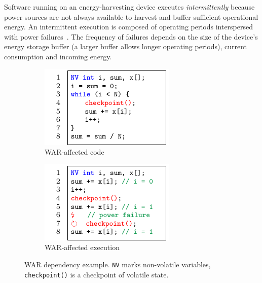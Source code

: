 Software running on an energy-harvesting device executes {\em intermittently} because power sources are not always available to harvest and buffer sufficient operational energy. An intermittent execution is composed of operating periods interspersed with power failures~\cite{dino,chain,alpaca,ratchet}. The frequency of failures depends on the size of the device's energy storage buffer (a larger buffer allows longer operating periods), current consumption and incoming energy.

\begin{figure}		
	\centering
	\begin{minipage}{.8\textwidth}
	\begin{subfigure}{.5\columnwidth}
			\includegraphics[width=\columnwidth, trim={.3cm 0 0 0}]{figures/war-example.pdf}
		\caption{WAR-affected code}
		\label{fig:war-example}
	\end{subfigure}
	\begin{subfigure}{.5\columnwidth}
			\includegraphics[width=\columnwidth,trim={.3cm 0 0 0 }  ]{figures/war-execution.pdf}
		\caption{WAR-affected execution}
		\label{fig:war-execution}
	\end{subfigure}
	\caption{WAR dependency example. \texttt{NV} marks non-volatile variables, \texttt{checkpoint()} is a checkpoint of volatile state.	\label{fig:w-a-r}}
	\end{minipage}
\end{figure}

